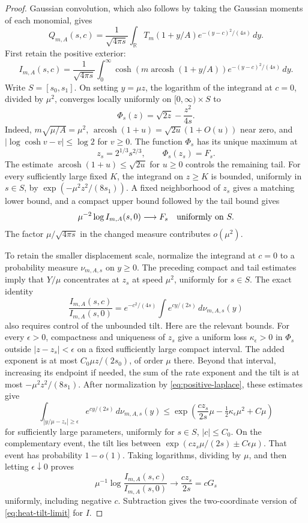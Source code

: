 \begin{proof}
Gaussian convolution, which also follows by taking the Gaussian moments
of each monomial, gives
\[
 Q_{m,A}(s,c)=\frac1{\sqrt{4\pi s}}
 \int_{\mathbb R}T_m(1+y/A)e^{-(y-c)^2/(4s)}\,dy.
\]
First retain the positive exterior:
\[
 I_{m,A}(s,c)=\frac1{\sqrt{4\pi s}}\int_0^\infty
 \cosh\!\left(m\operatorname{arcosh}(1+y/A)\right)
 e^{-(y-c)^2/(4s)}\,dy.
\]
Write $S=[s_0,s_1]$.  On setting $y=\mu z$, the logarithm of the
integrand at $c=0$, divided by $\mu^2$, converges locally uniformly on
$[0,\infty)\times S$ to
\[
 \Phi_s(z)=\sqrt{2z}-\frac{z^2}{4s}.
\]
Indeed, $m\sqrt{\mu/A}=\mu^2$,
$\operatorname{arcosh}(1+u)=\sqrt{2u}(1+O(u))$ near zero, and
$|\log\cosh v-v|\le\log2$ for $v\ge0$.
The function $\Phi_s$ has its unique maximum at
\[
 z_s=2^{1/3}s^{2/3},\qquad \Phi_s(z_s)=F_s.
\]
The estimate $\operatorname{arcosh}(1+u)\le\sqrt{2u}$ for $u\ge0$
controls the remaining tail.  For every sufficiently large fixed $K$,
the integrand on $z\ge K$ is bounded, uniformly in $s\in S$, by
$\exp(-\mu^2z^2/(8s_1))$.  A fixed neighborhood of $z_s$ gives a
matching lower bound, and a compact upper bound followed by the tail
bound gives
\begin{equation}\label{eq:positive-laplace}
 \mu^{-2}\log I_{m,A}(s,0)\longrightarrow F_s
 \quad\hbox{uniformly on }S.
\end{equation}
The factor $\mu/\sqrt{4\pi s}$ in the changed measure contributes
$o(\mu^2)$.

To retain the smaller displacement scale, normalize the integrand at
$c=0$ to a probability measure $\nu_{m,A,s}$ on $y\ge0$.  The preceding
compact and tail estimates imply that $Y/\mu$ concentrates at $z_s$ at
speed $\mu^2$, uniformly for $s\in S$.  The exact identity
\begin{equation}\label{eq:exact-gaussian-tilt}
 \frac{I_{m,A}(s,c)}{I_{m,A}(s,0)}
 =e^{-c^2/(4s)}\int e^{cy/(2s)}\,d\nu_{m,A,s}(y)
\end{equation}
also requires control of the unbounded tilt.  Here are the relevant
bounds.  For every $\epsilon>0$, compactness and uniqueness of $z_s$
give a uniform loss $\kappa_\epsilon>0$ in $\Phi_s$ outside
$|z-z_s|<\epsilon$ on a fixed sufficiently large compact interval.
The added exponent is at most $C_0\mu z/(2s_0)$, of order $\mu$ there.
Beyond that interval, increasing its endpoint if needed, the sum of the
rate exponent and the tilt is at most $-\mu^2z^2/(8s_1)$.
After normalization by \eqref{eq:positive-laplace}, these estimates give
\[
 \int_{|y/\mu-z_s|\ge\epsilon}e^{cy/(2s)}\,d\nu_{m,A,s}(y)
 \le \exp\!\left(\frac{cz_s}{2s}\mu
                 -\tfrac12\kappa_\epsilon\mu^2+C\mu\right)
\]
for sufficiently large parameters, uniformly for $s\in S$, $|c|\le C_0$.
On the complementary event, the tilt lies between
$\exp(cz_s\mu/(2s)\pm C\epsilon\mu)$.  That event has probability
$1-o(1)$.  Taking logarithms, dividing by $\mu$, and then letting
$\epsilon\downarrow0$ proves
\[
 \mu^{-1}\log\frac{I_{m,A}(s,c)}{I_{m,A}(s,0)}
 \longrightarrow \frac{cz_s}{2s}=cG_s
\]
uniformly, including negative $c$.  Subtraction gives the two-coordinate
version of \eqref{eq:heat-tilt-limit} for $I$.


\end{proof}
